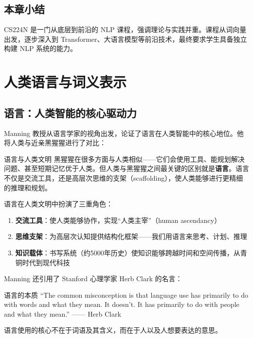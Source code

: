 \documentclass[a4paper]{article}
\begin{document}



\subsection{本章小结}

CS224N 是一门从底层到前沿的 NLP 课程，强调理论与实践并重。课程从词向量出发，逐步深入到 Transformer、大语言模型等前沿技术，最终要求学生具备独立构建 NLP 系统的能力。


\section{人类语言与词义表示}

\subsection{语言：人类智能的核心驱动力}

Manning 教授从语言学家的视角出发，论证了语言在人类智能中的核心地位。他将人类与近亲黑猩猩进行了对比：

\begin{knowledgebox}{语言与人类文明}
黑猩猩在很多方面与人类相似——它们会使用工具、能规划解决问题、甚至短期记忆优于人类。但人类与黑猩猩之间最关键的区别就是\textbf{语言}。语言不仅是交流工具，还是高层次思维的支架（scaffolding），使人类能够进行更精细的推理和规划。
\end{knowledgebox}

语言在人类文明中扮演了三重角色：

\begin{enumerate}
    \item \textbf{交流工具}：使人类能够协作，实现``人类主宰''（human ascendancy）
    \item \textbf{思维支架}：为高层次认知提供结构化框架——我们用语言来思考、计划、推理
    \item \textbf{知识载体}：书写系统（约5000年历史）使知识能够跨越时间和空间传播，从青铜时代到现代科技
\end{enumerate}





Manning 还引用了 Stanford 心理学家 Herb Clark 的名言：

\begin{importantbox}{语言的本质}
``The common misconception is that language use has primarily to do with words and what they mean. It doesn't. It has primarily to do with people and what they mean.'' —— Herb Clark

语言使用的核心不在于词语及其含义，而在于人以及人想要表达的意思。
\end{importantbox}
\end{document}
